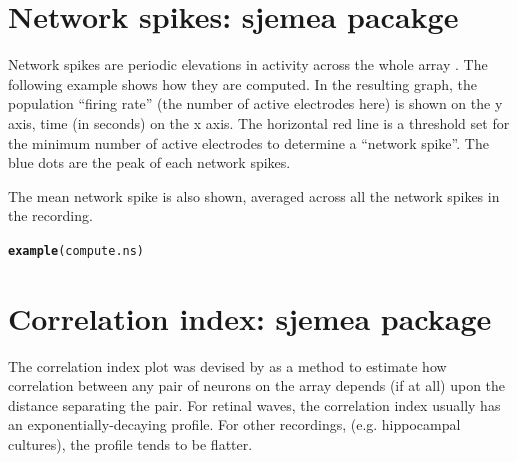 \documentclass{article}\usepackage[]{graphicx}\usepackage[]{color}
\makeatletter
\newcommand{\hlstd}[1]{\textcolor[rgb]{0.345,0.345,0.345}{#1}}%
\newcommand{\hlkwd}[1]{\textcolor[rgb]{0.737,0.353,0.396}{\textbf{#1}}}%
\newenvironment{kframe}{%
 \def\at@end@of@kframe{}%
 \ifinner\ifhmode%
  \def\at@end@of@kframe{\end{minipage}}%
  \begin{minipage}{\columnwidth}%
 \fi\fi%
 \def\FrameCommand##1{\hskip\@totalleftmargin \hskip-\fboxsep
 \colorbox{shadecolor}{##1}\hskip-\fboxsep
     \hskip-\linewidth \hskip-\@totalleftmargin \hskip\columnwidth}%
 \MakeFramed {\advance\hsize-\width
   \@totalleftmargin\z@ \linewidth\hsize
   \@setminipage}}%
 {\par\unskip\endMakeFramed%
 \at@end@of@kframe}
\newenvironment{knitrout}{}{} %
\makeatother
\begin{document}
\section*{Network spikes: sjemea pacakge }

Network spikes are periodic elevations in activity across the whole
array \citep{Eytan2006}.  The following example shows how they are computed.
In the resulting graph, the population ``firing rate'' (the number of
active electrodes here) is shown on the y axis, time (in seconds) on
the x axis.  The horizontal red line is a threshold set for the
minimum number of active electrodes to determine a ``network spike''.
The blue dots are the peak of each network spikes.

The mean network spike is also shown, averaged across all the network
spikes in the recording.

\begin{knitrout}
\color{fgcolor}\begin{kframe}
\begin{alltt}
\hlkwd{example}\hlstd{(compute.ns)}
\end{alltt}
\end{kframe}
\end{knitrout}


\section*{Correlation index: sjemea package}

The correlation index plot was devised by \citet{Wong1993} as a method to
estimate how correlation between any pair of neurons on the array
depends (if at all) upon the distance separating the pair.  For
retinal waves, the correlation index usually has an
exponentially-decaying profile.  For other recordings,
(e.g. hippocampal cultures), the profile tends to be flatter.
\end{document}
